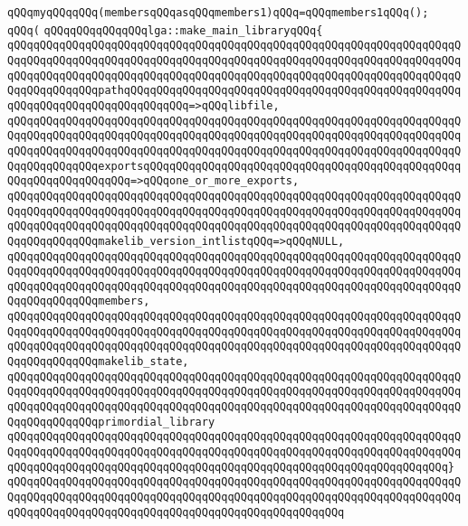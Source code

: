 \verb|qQQqmyqQQqqQQq(membersqQQqasqQQqmembers1)qQQq=qQQqmembers1qQQq();|\newline
\verb|qQQq(|\newline
\verb|qQQqqQQqqQQqqQQqlga::make_main_libraryqQQq{|\newline
\verb|qQQqqQQqqQQqqQQqqQQqqQQqqQQqqQQqqQQqqQQqqQQqqQQqqQQqqQQqqQQqqQQqqQQqqQQqqQQqqQQqqQQqqQQqqQQqqQQqqQQqqQQqqQQqqQQqqQQqqQQqqQQqqQQqqQQqqQQqqQQqqQQqqQQqqQQqqQQqqQQqqQQqqQQqqQQqqQQqqQQqqQQqqQQqqQQqqQQqqQQqqQQqqQQqqQQqqQQqqQQqqQQqpathqQQqqQQqqQQqqQQqqQQqqQQqqQQqqQQqqQQqqQQqqQQqqQQqqQQqqQQqqQQqqQQqqQQqqQQqqQQqqQQq=>qQQqlibfile,|\newline
\verb|qQQqqQQqqQQqqQQqqQQqqQQqqQQqqQQqqQQqqQQqqQQqqQQqqQQqqQQqqQQqqQQqqQQqqQQqqQQqqQQqqQQqqQQqqQQqqQQqqQQqqQQqqQQqqQQqqQQqqQQqqQQqqQQqqQQqqQQqqQQqqQQqqQQqqQQqqQQqqQQqqQQqqQQqqQQqqQQqqQQqqQQqqQQqqQQqqQQqqQQqqQQqqQQqqQQqqQQqqQQqqQQqexportsqQQqqQQqqQQqqQQqqQQqqQQqqQQqqQQqqQQqqQQqqQQqqQQqqQQqqQQqqQQqqQQqqQQq=>qQQqone_or_more_exports,|\newline
\verb|qQQqqQQqqQQqqQQqqQQqqQQqqQQqqQQqqQQqqQQqqQQqqQQqqQQqqQQqqQQqqQQqqQQqqQQqqQQqqQQqqQQqqQQqqQQqqQQqqQQqqQQqqQQqqQQqqQQqqQQqqQQqqQQqqQQqqQQqqQQqqQQqqQQqqQQqqQQqqQQqqQQqqQQqqQQqqQQqqQQqqQQqqQQqqQQqqQQqqQQqqQQqqQQqqQQqqQQqqQQqqQQqmakelib_version_intlistqQQq=>qQQqNULL,|\newline
\verb|qQQqqQQqqQQqqQQqqQQqqQQqqQQqqQQqqQQqqQQqqQQqqQQqqQQqqQQqqQQqqQQqqQQqqQQqqQQqqQQqqQQqqQQqqQQqqQQqqQQqqQQqqQQqqQQqqQQqqQQqqQQqqQQqqQQqqQQqqQQqqQQqqQQqqQQqqQQqqQQqqQQqqQQqqQQqqQQqqQQqqQQqqQQqqQQqqQQqqQQqqQQqqQQqqQQqqQQqqQQqqQQqmembers,|\newline
\verb|qQQqqQQqqQQqqQQqqQQqqQQqqQQqqQQqqQQqqQQqqQQqqQQqqQQqqQQqqQQqqQQqqQQqqQQqqQQqqQQqqQQqqQQqqQQqqQQqqQQqqQQqqQQqqQQqqQQqqQQqqQQqqQQqqQQqqQQqqQQqqQQqqQQqqQQqqQQqqQQqqQQqqQQqqQQqqQQqqQQqqQQqqQQqqQQqqQQqqQQqqQQqqQQqqQQqqQQqqQQqqQQqmakelib_state,|\newline
\verb|qQQqqQQqqQQqqQQqqQQqqQQqqQQqqQQqqQQqqQQqqQQqqQQqqQQqqQQqqQQqqQQqqQQqqQQqqQQqqQQqqQQqqQQqqQQqqQQqqQQqqQQqqQQqqQQqqQQqqQQqqQQqqQQqqQQqqQQqqQQqqQQqqQQqqQQqqQQqqQQqqQQqqQQqqQQqqQQqqQQqqQQqqQQqqQQqqQQqqQQqqQQqqQQqqQQqqQQqqQQqqQQqprimordial_library|\newline
\verb|qQQqqQQqqQQqqQQqqQQqqQQqqQQqqQQqqQQqqQQqqQQqqQQqqQQqqQQqqQQqqQQqqQQqqQQqqQQqqQQqqQQqqQQqqQQqqQQqqQQqqQQqqQQqqQQqqQQqqQQqqQQqqQQqqQQqqQQqqQQqqQQqqQQqqQQqqQQqqQQqqQQqqQQqqQQqqQQqqQQqqQQqqQQqqQQqqQQqqQQqqQQqqQQq}|\newline
\verb|qQQqqQQqqQQqqQQqqQQqqQQqqQQqqQQqqQQqqQQqqQQqqQQqqQQqqQQqqQQqqQQqqQQqqQQqqQQqqQQqqQQqqQQqqQQqqQQqqQQqqQQqqQQqqQQqqQQqqQQqqQQqqQQqqQQqqQQqqQQqqQQqqQQqqQQqqQQqqQQqqQQqqQQqqQQqqQQqqQQqqQQqqQQqqQQq|\newline
